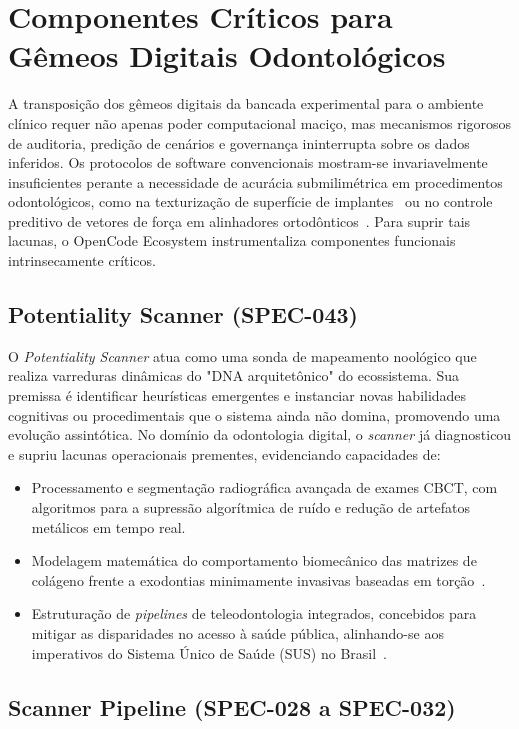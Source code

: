\section{Componentes Críticos para Gêmeos Digitais Odontológicos}

A transposição dos gêmeos digitais da bancada experimental para o ambiente clínico requer não apenas poder computacional maciço, mas mecanismos rigorosos de auditoria, predição de cenários e governança ininterrupta sobre os dados inferidos. Os protocolos de software convencionais mostram-se invariavelmente insuficientes perante a necessidade de acurácia submilimétrica em procedimentos odontológicos, como na texturização de superfície de implantes~\cite{Alshadidi2024} ou no controle preditivo de vetores de força em alinhadores ortodônticos~\cite{Olawade2026}. Para suprir tais lacunas, o OpenCode Ecosystem instrumentaliza componentes funcionais intrinsecamente críticos.

\subsection{Potentiality Scanner (SPEC-043)}
O \textit{Potentiality Scanner} atua como uma sonda de mapeamento noológico que realiza varreduras dinâmicas do "DNA arquitetônico" do ecossistema. Sua premissa é identificar heurísticas emergentes e instanciar novas habilidades cognitivas ou procedimentais que o sistema ainda não domina, promovendo uma evolução assintótica. No domínio da odontologia digital, o \textit{scanner} já diagnosticou e supriu lacunas operacionais prementes, evidenciando capacidades de:
\begin{itemize}
    \item Processamento e segmentação radiográfica avançada de exames CBCT, com algoritmos para a supressão algorítmica de ruído e redução de artefatos metálicos em tempo real.
    \item Modelagem matemática do comportamento biomecânico das matrizes de colágeno frente a exodontias minimamente invasivas baseadas em torção~\cite{Xing2024}.
    \item Estruturação de \textit{pipelines} de teleodontologia integrados, concebidos para mitigar as disparidades no acesso à saúde pública, alinhando-se aos imperativos do Sistema Único de Saúde (SUS) no Brasil~\cite{Frota2025, Cuadros2023}.
\end{itemize}

\subsection{Scanner Pipeline (SPEC-028 a SPEC-032)}

